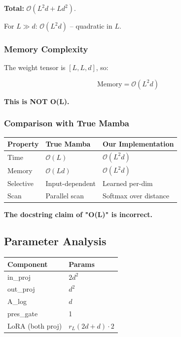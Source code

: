 \textbf{Total:} $\mathcal{O}(L^2 d + L d^2)$.

For $L \gg d$: \textbf{$\mathcal{O}(L^2 d)$} -- quadratic in $L$.

\subsubsection{Memory Complexity}

The weight tensor is $[L, L, d]$, so:

\[
\text{Memory} = \mathcal{O}(L^2 d)
\tag{4.15}
\]

\textbf{This is NOT O(L).}

\subsubsection{Comparison with True Mamba}

\begin{table}[H]
\centering
\small
\begin{tabular}{lll}
\toprule
\textbf{Property} & \textbf{True Mamba} & \textbf{Our Implementation} \\
\midrule
Time & $\mathcal{O}(L)$ & $\mathcal{O}(L^2 d)$ \\
Memory & $\mathcal{O}(L d)$ & $\mathcal{O}(L^2 d)$ \\
Selective & Input-dependent & Learned per-dim \\
Scan & Parallel scan & Softmax over distance \\
\bottomrule
\end{tabular}
\end{table}

\textbf{The docstring claim of "O(L)" is incorrect.}

\subsection{Parameter Analysis}

\begin{table}[H]
\centering
\small
\begin{tabular}{ll}
\toprule
\textbf{Component} & \textbf{Params} \\
\midrule
in\_proj & $2 d^2$ \\
out\_proj & $d^2$ \\
A\_log & $d$ \\
pres\_gate & 1 \\
LoRA (both proj) & $r_L (2d + d) \cdot 2$ \\
\bottomrule
\end{tabular}
\end{table}

